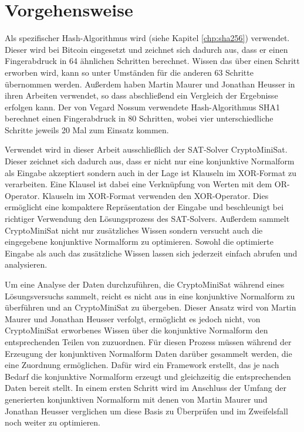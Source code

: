 \section{Vorgehensweise}

Als spezifischer Hash-Algorithmus wird  (siehe Kapitel \ref{chp:sha256}) verwendet. Dieser wird bei Bitcoin eingesetzt
und zeichnet sich dadurch aus, dass er einen Fingerabdruck in 64 ähnlichen Schritten berechnet. Wissen das über einen Schritt
erworben wird, kann so unter Umständen für die anderen 63 Schritte übernommen werden. Außerdem haben Martin Maurer und Jonathan
Heusser  in ihren Arbeiten verwendet, so dass abschließend ein Vergleich der Ergebnisse erfolgen kann. Der von Vegard Nossum
verwendete Hash-Algorithmus SHA1 berechnet einen Fingerabdruck in 80 Schritten, wobei vier unterschiedliche Schritte jeweils 20 Mal
zum Einsatz kommen.

Verwendet wird in dieser Arbeit ausschließlich der SAT-Solver CryptoMiniSat. Dieser zeichnet sich dadurch aus, dass er nicht nur
eine konjunktive Normalform als Eingabe akzeptiert sondern auch in der Lage ist Klauseln im XOR-Format zu verarbeiten. Eine Klausel
ist dabei eine Verknüpfung von Werten mit dem OR-Operator. Klauseln im XOR-Format verwenden den XOR-Operator. Dies ermöglicht
eine kompaktere Repräsentation der Eingabe und beschleunigt bei richtiger Verwendung den Lösungsprozess des SAT-Solvers.
Außerdem sammelt CryptoMiniSat nicht nur zusätzliches Wissen sondern versucht auch die eingegebene konjunktive Normalform zu
optimieren. Sowohl die optimierte Eingabe als auch das zusätzliche Wissen lassen sich jederzeit einfach abrufen und analysieren.

Um eine Analyse der Daten durchzuführen, die CryptoMiniSat während eines Lösungsversuchs sammelt, reicht es nicht aus 
in eine konjunktive Normalform zu überführen und an CryptoMiniSat zu übergeben. Dieser Ansatz wird von Martin Maurer und Jonathan
Heusser verfolgt, ermöglicht es jedoch nicht, von CryptoMiniSat erworbenes Wissen über die konjunktive Normalform den
entsprechenden Teilen von  zuzuordnen. Für diesen Prozess müssen während der Erzeugung der konjunktiven Normalform
Daten darüber gesammelt werden, die eine Zuordnung ermöglichen. Dafür wird ein Framework erstellt, das je nach Bedarf
die konjunktive Normalform erzeugt und gleichzeitig die entsprechenden Daten bereit stellt. In einem ersten Schritt
wird im Anschluss der Umfang der generierten konjunktiven Normalform mit denen von Martin Maurer und Jonathan Heusser
verglichen um diese Basis zu Überprüfen und im Zweifelsfall noch weiter zu optimieren.

